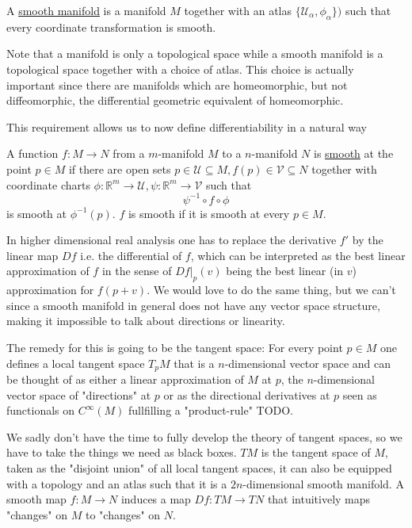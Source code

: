 \begin{definition}
A \underline{smooth manifold} is a manifold
$M$ together with an atlas $\{\mathcal{U}_\alpha, \phi_\alpha\})$  such that
every coordinate transformation is smooth.
\end{definition}
\begin{remark}
Note that a manifold is only a topological space while a smooth manifold is
a topological space together with a choice of atlas. This choice is actually
important since there are manifolds which are homeomorphic,
but not diffeomorphic, the differential geometric equivalent of homeomorphic.
\end{remark}
This requirement allows us to now define differentiability in a natural way
\begin{definition}
A function $f: M \to N$ from a $m$-manifold $M$ to a $n$-manifold $N$ is
\underline{smooth} at the point $p \in M$ if there are open sets
$p \in \mathcal{U} \subseteq M, f(p) \in \mathcal{V} \subseteq N$ together
with coordinate charts $\phi: \mathbb{R}^m \to \mathcal{U},
\psi: \mathbb{R}^m \to \mathcal{V}$ such that
\[
	\psi^{-1} \circ f \circ \phi
\]
is smooth at $\phi^{-1}(p)$. $f$ is smooth if it is smooth at every $p \in M$.
\end{definition}

In higher dimensional real analysis one has to replace the derivative $f'$ by the linear
map $Df$ i.e. the differential of $f$, which can be interpreted as the best linear
approximation of $f$ in the sense of $Df|_p(v)$ being the best linear (in $v$)
approximation for $f(p + v)$. We would love to do the same thing, but we can't since a
smooth manifold in general does not have any vector space structure, making it impossible
to talk about directions or linearity.

The remedy for this is going to be the tangent space: For every point $p \in M$ one
defines a local tangent space $T_p M$ that is a $n$-dimensional vector space and can
be thought of as either a linear approximation of $M$ at $p$, the $n$-dimensional vector
space of "directions" at $p$ or as the directional derivatives at $p$ seen as functionals
on $C^\infty(M)$ fullfilling a "product-rule" TODO.

We sadly don't have the time to fully develop the theory of tangent spaces, so we have
to take the things we need as black boxes. $TM$ is the tangent space of $M$, taken as the
"disjoint union" of all local tangent spaces, it can also be equipped with a topology and
an atlas such that it is a $2n$-dimensional smooth manifold. A smooth map $f: M \to N$
induces a map $Df: TM \to TN$ that intuitively maps "changes" on $M$ to "changes" on $N$.

